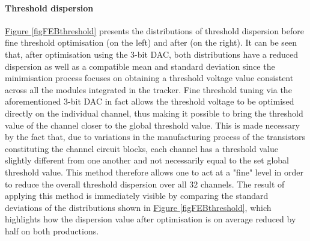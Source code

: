 \paragraph{Threshold dispersion} \hyperref[figFEBthreshold]{Figure \ref{figFEBthreshold}} presents the distributions of threshold dispersion before fine threshold optimisation (on the left) and after (on the right). It can be seen that, after optimisation using the 3-bit DAC, both distributions have a reduced dispersion as well as a compatible mean and standard deviation since the minimisation process focuses on obtaining a threshold voltage value consistent across all the modules integrated in the tracker. Fine threshold tuning via the aforementioned 3-bit DAC in fact allows the threshold voltage to be optimised directly on the individual channel, thus making it possible to bring the threshold value of the channel closer to the global threshold value. This is made necessary by the fact that, due to variations in the manufacturing process of the transistors constituting the channel circuit blocks, each channel has a threshold value slightly different from one another and not necessarily equal to the set global threshold value. This method therefore allows one to act at a "fine" level in order to reduce the overall threshold dispersion over all 32 channels. The result of applying this method is immediately visible by comparing the standard deviations of the distributions shown in \hyperref[figFEBthreshold]{Figure \ref{figFEBthreshold}}, which highlights how the dispersion value after optimisation is on average reduced by half on both productions.

